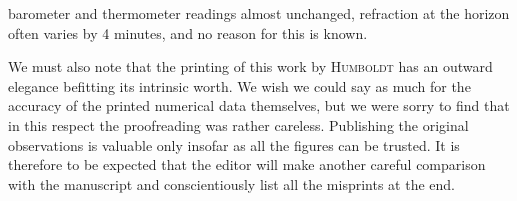 barometer and thermometer readings almost unchanged, refraction at the horizon often varies by 4 minutes, and no reason for this is known.

We must also note that the printing of this work by \textsc{Humboldt} has an outward elegance befitting its intrinsic worth. We wish we could say as much for the accuracy of the printed numerical data themselves, but we were sorry to find that in this respect the proofreading was rather careless. Publishing the original observations is valuable only insofar as all the figures can be trusted. It is therefore to be expected that the editor will make another careful comparison with the manuscript and conscientiously list all the misprints at the end.
